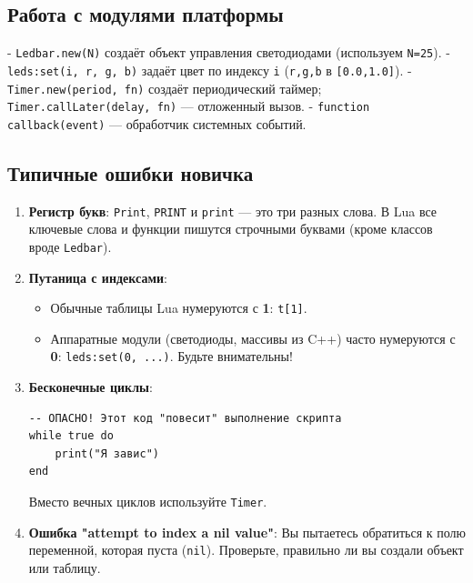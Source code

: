 \subsection{Работа с модулями платформы}
- \verb|Ledbar.new(N)| создаёт объект управления светодиодами (используем \verb|N=25|).
- \verb|leds:set(i, r, g, b)| задаёт цвет по индексу \verb|i| (\verb|r,g,b| в \verb|[0.0,1.0]|).
- \verb|Timer.new(period, fn)| создаёт периодический таймер; \verb|Timer.callLater(delay, fn)| — отложенный вызов.
- \verb|function callback(event)| — обработчик системных событий.

\subsection{Типичные ошибки новичка}
\begin{enumerate}
    \item \textbf{Регистр букв}: \texttt{Print}, \texttt{PRINT} и \texttt{print} — это три разных слова. В Lua все ключевые слова и функции пишутся строчными буквами (кроме классов вроде \texttt{Ledbar}).
    \item \textbf{Путаница с индексами}:
    \begin{itemize}
        \item Обычные таблицы Lua нумеруются с \textbf{1}: \texttt{t[1]}.
        \item Аппаратные модули (светодиоды, массивы из C++) часто нумеруются с \textbf{0}: \texttt{leds:set(0, ...)}. Будьте внимательны!
    \end{itemize}
    \item \textbf{Бесконечные циклы}:
    \begin{verbatim}
-- ОПАСНО! Этот код "повесит" выполнение скрипта
while true do
    print("Я завис")
end
    \end{verbatim}
    Вместо вечных циклов используйте \texttt{Timer}.
    \item \textbf{Ошибка "attempt to index a nil value"}: Вы пытаетесь обратиться к полю переменной, которая пуста (\texttt{nil}). Проверьте, правильно ли вы создали объект или таблицу.
\end{enumerate}

